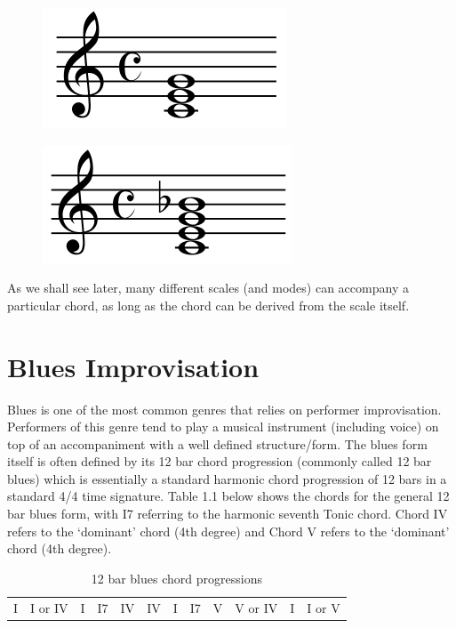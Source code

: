 \documentclass[pdftex,12pt,a4paper]{report}
\begin{document}
\begin{figure}[here]
  \centering
  \includegraphics[scale=0.4]{figure/cmajortriad.png}
  \label{fig:cmajortriad}
\end{figure}

\begin{figure}[here]
  \centering
  \includegraphics[scale=0.38]{figure/cdominantseventh.png}
  \label{fig:cdominantseventh}
\end{figure}

As we shall see later, many different scales (and modes) can accompany a particular chord, as long as the chord can be derived from the scale itself.

\section{Blues Improvisation}
Blues is one of the most common genres that relies on performer improvisation. Performers of this genre tend to play a musical instrument (including voice) on top of an accompaniment with a well defined structure/form. The blues form itself is often defined by its 12 bar chord progression (commonly called 12 bar blues) which is essentially a standard harmonic chord progression of 12 bars in a standard 4/4 time signature. Table 1.1 below shows the chords for the general 12 bar blues form, with I7 referring to the harmonic seventh Tonic chord. Chord IV refers to the `dominant' chord (4th degree) and Chord V refers to the `dominant' chord (4th degree).

\begin{table}[here]
\centering
{}
\begin{tabular}{|*{12}{C|}}
  I & I or IV & I & I7 & IV & IV & I & I7 & V & V or IV & I & I or V
\end{tabular}
\caption{12 bar blues chord progressions}
\label{12 bar blues}
\end{table}
\end{document}
